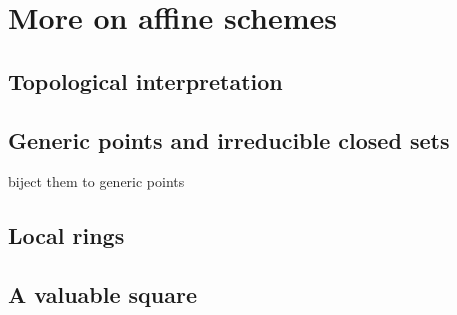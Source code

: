 \chapter{More on affine schemes}
\section{Topological interpretation}

\section{Generic points and irreducible closed sets}
biject them to generic points

\section{Local rings}

\section{A valuable square}

